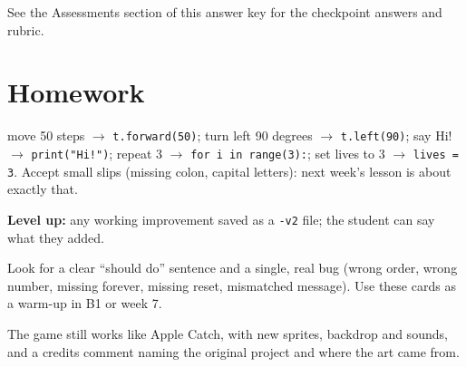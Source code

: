 \begin{answer}
See the Assessments section of this answer key for the checkpoint answers and rubric.
\end{answer}

\section{Homework}
\begin{answer}
move 50 steps $\rightarrow$ \texttt{t.forward(50)}; turn left 90 degrees $\rightarrow$ \texttt{t.left(90)}; say Hi! $\rightarrow$ \texttt{print("Hi!")}; repeat 3 $\rightarrow$ \texttt{for i in range(3):}; set lives to 3 $\rightarrow$ \texttt{lives = 3}.
Accept small slips (missing colon, capital letters): next week's lesson is about exactly that.

\textbf{Level up:} any working improvement saved as a \texttt{-v2} file; the student can say what they added.
\end{answer}

\begin{answer}
Look for a clear \enquote{should do} sentence and a single, real bug (wrong order, wrong number, missing forever, missing reset, mismatched message). Use these cards as a warm-up in B1 or week 7.
\end{answer}

\begin{answer}
The game still works like Apple Catch, with new sprites, backdrop and sounds, and a credits comment naming the original project and where the art came from.
\end{answer}
